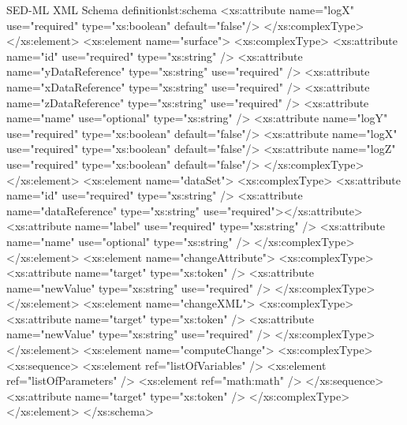 \begin{myXmlLst}{SED-ML XML Schema definition}{lst:schema}
			<xs:attribute name="logX" use="required" type="xs:boolean" default="false"/>
		</xs:complexType>
	</xs:element>
	<xs:element name="surface">
		<xs:complexType>
			<xs:attribute name="id" use="required" type="xs:string" />
			<xs:attribute name="yDataReference" type="xs:string"
				use="required" />
			<xs:attribute name="xDataReference" type="xs:string"
				use="required" />
			<xs:attribute name="zDataReference" type="xs:string"
				use="required" />
			<xs:attribute name="name" use="optional" type="xs:string" />
			<xs:attribute name="logY" use="required" type="xs:boolean" default="false"/>
			<xs:attribute name="logX" use="required" type="xs:boolean" default="false"/>
			<xs:attribute name="logZ" use="required" type="xs:boolean" default="false"/>
		</xs:complexType>
	</xs:element>
	<xs:element name="dataSet">
		<xs:complexType>
			<xs:attribute name="id" use="required" type="xs:string" />
			<xs:attribute name="dataReference" type="xs:string" use="required"></xs:attribute>
			<xs:attribute name="label" use="required" type="xs:string" />
			<xs:attribute name="name" use="optional" type="xs:string" />
		</xs:complexType>
	</xs:element>
	<xs:element name="changeAttribute">
		<xs:complexType>
			<xs:attribute name="target" type="xs:token" />
			<xs:attribute name="newValue" type="xs:string" use="required" />
		</xs:complexType>
	</xs:element>
	<xs:element name="changeXML">
		<xs:complexType>
			<xs:attribute name="target" type="xs:token" />
			<xs:attribute name="newValue" type="xs:string" use="required" />
		</xs:complexType>
	</xs:element>
	<xs:element name="computeChange">
		<xs:complexType>
			<xs:sequence>
				<xs:element ref="listOfVariables" />
				<xs:element ref="listOfParameters" />
				<xs:element ref="math:math" />
			</xs:sequence>
			<xs:attribute name="target" type="xs:token" />
		</xs:complexType>
	</xs:element>
</xs:schema>

\end{myXmlLst}

